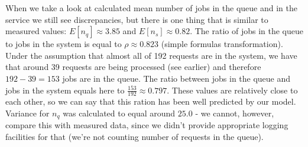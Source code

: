 \documentclass[11pt]{article}
\begin{document}

When we take a look at calculated mean number of jobs in the queue and in the service we still see discrepancies, but there is one thing that is similar to measured values:
$E[n_q] 
\approx 3.85$ and
$E[n_s] 
\approx 0.82$.
The ratio of jobs in the queue to jobs in the system is equal to $\rho \approx 0.823$ (simple formulas transformation). Under the assumption that almost all of 192 requests are in the system, we have that around 39 requests are being processed (see earlier) and therefore $192-39 = 153$ jobs are in the queue. The ratio between jobs in the queue and jobs in the system equals here to $\frac{153}{192} \approx 0.797$. These values are relatively close to each other, so we can say that this ration has been well predicted by our model. Variance for $n_q$ was calculated to equal around $25.0$ - we cannot, however, compare this with measured data, since we didn't provide appropriate logging facilities for that (we're not counting number of requests in the queue). 

\end{document}
